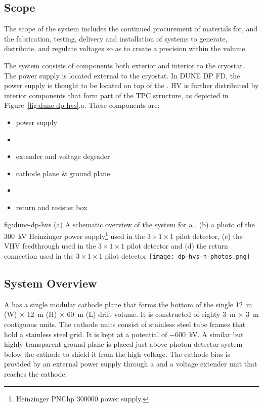 \subsection{Scope}
\label{sec:fddp-hv-scope}
The scope of the \hv system 
includes the continued procurement of materials for, and the fabrication, testing, delivery and installation of systems to generate, distribute, and regulate voltages so as to create a precision \efield within the \detmodule volume. 

The \hv system consists of components both exterior and interior to the cryostat. The \hv power supply is located external to the cryostat.  In DUNE DP FD, the \hv power supply is thought to be located on top of the \hv \fdth. HV is further distributed by interior components that form part of the TPC structure, as depicted in Figure~\ref{fig:dune-dp-hvs}.a.  These components are:


\begin{itemize}
\item power supply
\item {} \fdth
\item \hv extender and voltage degrader
\item cathode plane \& ground plane
\item \fcage
\item \hv return \fdth and resister box
\end{itemize}


\begin{dunefigure}
{fig:dune-dp-hvs}
{(a) A schematic overview of the \hv system for a \dpmod{}, 
(b) a photo of the \SI{300}{\kV} Heinzinger power supply\footnote{Heinzinger\texttrademark{} PNChp 300000 power supply.} used in the $3\times 1\times 1$ pilot \dual detector, (c) the VHV feedthrough used in the $3\times 1\times 1$ pilot \dual detector and (d) the \hv return connection used in the $3\times 1 \times 1$ pilot \dual detector}
\texttt{[image: dp-hvs-n-photos.png]}
\end{dunefigure}

\subsection{System Overview}

A \dpmod  has a single modular cathode plane that forms the bottom of the single  \SI{12}{\m} (W) $\times$ \SI{12}{\m} (H) $\times$ \SI{60}{\m} (L) drift volume. It is constructed of eighty \SI{3}{\m} $\times$ \SI{3}{\m} contiguous units. 
The cathode units consist of stainless steel tube frames that hold a stainless steel grid. It is kept at a potential of \SI{-600}{\kV}.  A similar but highly transparent ground plane is placed just above photon detector system below the cathode to shield it from the high voltage.
The cathode bias is provided by an external \hv power supply through a \hv \fdth and a voltage extender unit that reaches the cathode.
 
